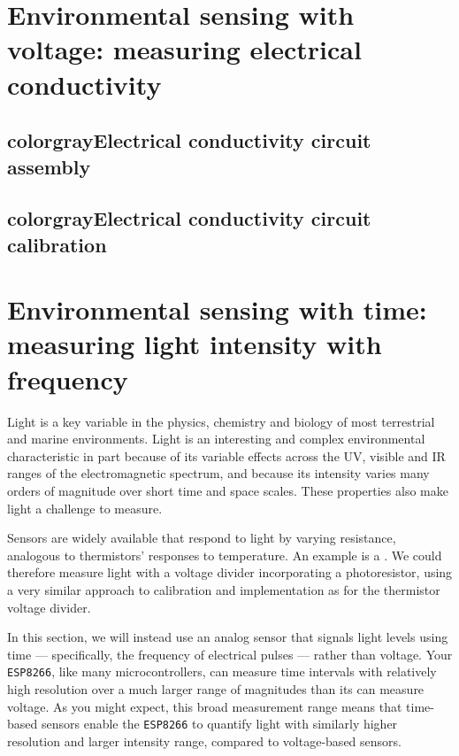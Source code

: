 \section{\color{gray} Environmental sensing with voltage: measuring electrical conductivity \color{black}}
\subsection{color{gray}Electrical conductivity circuit assembly \color{black}}
\subsection{color{gray}Electrical conductivity circuit calibration \color{black}}

\section{Environmental sensing with time: measuring light intensity with frequency}
Light is a key variable in the physics, chemistry and biology of most terrestrial and marine environments.
Light is an interesting and complex environmental characteristic in part because of its variable effects across the UV, visible and IR ranges of the electromagnetic spectrum, and because its intensity varies many orders of magnitude over short time and space scales.
These properties also make light a challenge to measure.

Sensors are widely available that respond to light by varying resistance, analogous to thermistors' responses to temperature.
An example is a .
We could therefore measure light with a voltage divider incorporating a photoresistor, using a very similar approach to calibration and implementation as for the thermistor voltage divider.

In this section, we will instead use an analog sensor that signals light levels using time --- specifically, the frequency of electrical pulses --- rather than voltage.
Your \texttt{ESP8266}, like many microcontrollers, can measure time intervals with relatively high resolution over a much larger range of magnitudes than its \adc can measure voltage.
As you might expect, this broad measurement range means that time-based sensors enable the \texttt{ESP8266} to quantify light with similarly higher resolution and larger intensity range, compared to voltage-based sensors.

